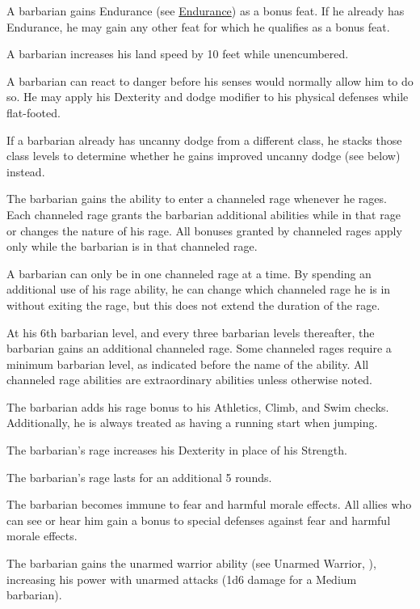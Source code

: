  A barbarian gains Endurance (see \hyperlink{feat:Endurance}{Endurance}) as a bonus feat. If he already has Endurance, he may gain any other feat for which he qualifies as a bonus feat.

 A barbarian increases his land speed by 10 feet while unencumbered.

 A barbarian can react to danger before his senses would normally allow him to do so. He may apply his Dexterity and dodge modifier to his physical defenses while flat-footed.

If a barbarian already has uncanny dodge from a different class, he stacks those class levels to determine whether he gains improved uncanny dodge (see below) instead.

 The barbarian gains the ability to enter a channeled rage whenever he rages. Each channeled rage grants the barbarian additional abilities while in that rage or changes the nature of his rage. All bonuses granted by channeled rages apply only while the barbarian is in that channeled rage.

A barbarian can only be in one channeled rage at a time. By spending an additional use of his rage ability, he can change which channeled rage he is in without exiting the rage, but this does not extend the duration of the rage.

At his 6th barbarian level, and every three barbarian levels thereafter, the barbarian gains an additional channeled rage. Some channeled rages require a minimum barbarian level, as indicated before the name of the ability. All channeled rage abilities are extraordinary abilities unless otherwise noted.

 The barbarian adds his rage bonus to his Athletics, Climb, and Swim checks. Additionally, he is always treated as having a running start when jumping.

 The barbarian's rage increases his Dexterity in place of his Strength.

 The barbarian's rage lasts for an additional 5 rounds.

 The barbarian becomes immune to fear and harmful morale effects. All allies who can see or hear him gain a  bonus to special defenses against fear and harmful morale effects.

 The barbarian gains the unarmed warrior ability (see Unarmed Warrior, ), increasing his power with unarmed attacks (1d6 damage for a Medium barbarian).

